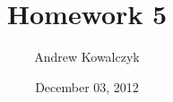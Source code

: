 \documentclass[11pt, oneside]{article}   	%
\title{Homework 5}
\author{Andrew Kowalczyk}
\date{December 03, 2012}							%
\begin{document}
\maketitle
\section{}
\section{}
\section{}
\section{}
\section{}
\section{}
\section{}
\section{}
\section{}
\section{}
\section{}
\section{}
\section{}
\section{}
\section{}
\end{document}

